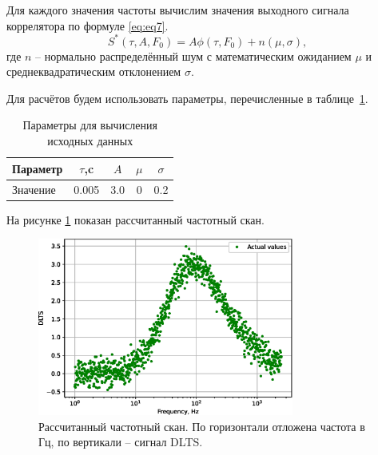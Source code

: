 \documentclass{report}
\begin{document}
        Для каждого значения частоты вычислим значения выходного сигнала 
        коррелятора по формуле \ref{eq:eq7}.
        \begin{equation}
            \label{eq:eq7}
            S^*\left(\tau,A,F_0\right) = A\phi\left(\tau,F_0\right) + n(\mu, \sigma),
        \end{equation}
        где $n$ -- нормально распределённый шум с математическим ожиданием 
        $\mu$ и среднеквадратическим отклонением $\sigma$.
        
        Для расчётов будем использовать параметры, перечисленные в таблице~\ref{table:table2}.

        \begin{table}[ht]
            \caption{Параметры для вычисления исходных данных}
            \label{table:table2}
            \centering
            \begin{tabular}{ | l | c | c | c | c | }
                \hline
                Параметр & $\tau$,c & $A$ & $\mu$ & $\sigma$ \\
                \hline
                Значение & 0.005 & 3.0 & 0 & 0.2 \\
                \hline
            \end{tabular}
        \end{table}

        На рисунке \ref{pic:pic1} показан рассчитанный частотный скан.

        \begin{figure}[ht]
            \centering
            \includegraphics[width=0.75\textwidth]{experimental_data}

            \caption{Рассчитанный частотный скан. По горизонтали 
            отложена частота в Гц, по вертикали -- сигнал DLTS.}
            \label{pic:pic1}
        \end{figure}
\end{document}
